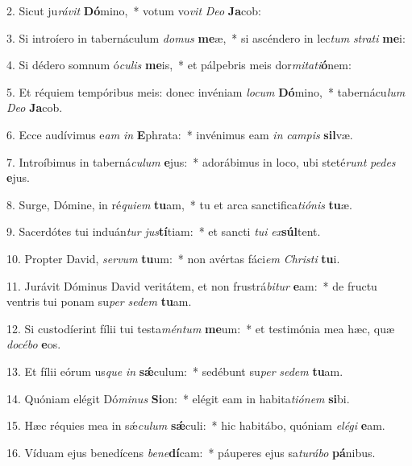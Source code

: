 2. Sicut ju\textit{rá}\textit{vit} \textbf{Dó}mino,~*  votum vo\textit{vit} \textit{De}\textit{o} \textbf{Ja}cob:\

3. Si introíero in tabernáculum \textit{do}\textit{mus} \textbf{me}æ,~*  si ascéndero in lec\textit{tum} \textit{stra}\textit{ti} \textbf{me}i:\

4. Si dédero somnum ó\textit{cu}\textit{lis} \textbf{me}is,~*  et pálpebris meis dor\textit{mi}\textit{ta}\textit{ti}\textbf{ó}nem:\

5. Et réquiem tempóribus meis: donec invéniam \textit{lo}\textit{cum} \textbf{Dó}mino,~*  tabernácu\textit{lum} \textit{De}\textit{o} \textbf{Ja}cob.\

6. Ecce audívimus e\textit{am} \textit{in} \textbf{E}phrata:~*  invénimus eam \textit{in} \textit{cam}\textit{pis} \textbf{sil}væ.\

7. Introíbimus in taberná\textit{cu}\textit{lum} \textbf{e}jus:~*  adorábimus in loco, ubi steté\textit{runt} \textit{pe}\textit{des} \textbf{e}jus.\

8. Surge, Dómine, in ré\textit{qui}\textit{em} \textbf{tu}am,~*  tu et arca sanctifica\textit{ti}\textit{ó}\textit{nis} \textbf{tu}æ.\

9. Sacerdótes tui induán\textit{tur} \textit{jus}\textbf{tí}tiam:~*  et sancti \textit{tu}\textit{i} \textit{ex}\textbf{súl}tent.\

10. Propter David, \textit{ser}\textit{vum} \textbf{tu}um:~*  non avértas fáci\textit{em} \textit{Chris}\textit{ti} \textbf{tu}i.\

11. Jurávit Dóminus David veritátem, et non frustrá\textit{bi}\textit{tur} \textbf{e}am:~*  de fructu ventris tui ponam su\textit{per} \textit{se}\textit{dem} \textbf{tu}am.\

12. Si custodíerint fílii tui testa\textit{mén}\textit{tum} \textbf{me}um:~*  et testimónia mea hæc, quæ \textit{do}\textit{cé}\textit{bo} \textbf{e}os.\

13. Et fílii eórum us\textit{que} \textit{in} \textbf{sǽ}culum:~*  sedébunt su\textit{per} \textit{se}\textit{dem} \textbf{tu}am.\

14. Quóniam elégit Dó\textit{mi}\textit{nus} \textbf{Si}on:~*  elégit eam in habita\textit{ti}\textit{ó}\textit{nem} \textbf{si}bi.\

15. Hæc réquies mea in sǽ\textit{cu}\textit{lum} \textbf{sǽ}culi:~*  hic habitábo, quóniam \textit{e}\textit{lé}\textit{gi} \textbf{e}am.\

16. Víduam ejus benedícens \textit{be}\textit{ne}\textbf{dí}cam:~*  páuperes ejus sa\textit{tu}\textit{rá}\textit{bo} \textbf{pá}nibus.\

